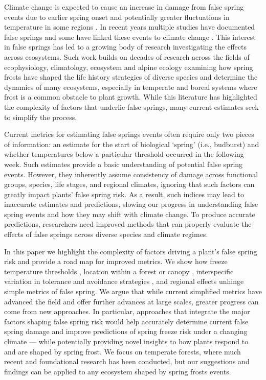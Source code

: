 \documentclass{article}\usepackage[]{graphicx}\usepackage[]{color}
\begin{document}
Climate change is expected to cause an increase in damage from false spring events due to earlier spring onset and potentially greater fluctuations in temperature in some regions \citep{Inouye2008, Martin2010}. In recent years multiple studies have documented false springs \citep{Augspurger2009, Augspurger2013, Gu2008, Menzel2015} and some have linked these events to climate change \citep{Allstadt2015, Ault2013,  Muffler2016, Vitra2017, Xin2016}. This interest in false springs has led to a growing body of research investigating the effects across ecosystems. Such work builds on decades of research across the fields of ecophysiology, climatology, ecosystem and alpine ecology examining how spring frosts have shaped the life history strategies of diverse species and determine the dynamics of many ecosystems, especially in temperate and boreal systems where frost is a common obstacle to plant growth. While this literature has highlighted the complexity of factors that underlie false springs, many current estimates seek to simplify the process. 

Current metrics for estimating false springs events often require only two pieces of information: an estimate for the start of biological `spring' (i.e., budburst) and whether temperatures below a particular threshold occurred in the following week. Such estimates provide a basic understanding of potential false spring events. However, they inherently assume consistency of damage across functional groups, species, life stages, and regional climates, ignoring that such factors can greatly impact plants' false spring risk. As a result, such indices may lead to inaccurate estimates and predictions, slowing our progress in understanding false spring events and how they may shift with climate change. To produce accurate predictions, researchers need improved methods that can properly evaluate the effects of false springs across diverse species and climate regimes.

In this paper we highlight the complexity of factors driving a plant's false spring risk and provide a road map for improved metrics. We show how freeze temperature thresholds \citep{Lenz2013}, location within a forest or canopy \citep{Augspurger2013}, interspecific variation in tolerance and avoidance strategies \citep{Martin2010, Muffler2016}, and regional effects \citep{Muffler2016} unhinge simple metrics of false spring. We argue that while current simplified metrics have advanced the field and offer further advances at large scales, greater progress can come from new approaches. In particular, approaches that integrate the major factors shaping false spring risk would help accurately determine current false spring damage and improve predictions of spring freeze risk under a changing climate --- while potentially providing novel insights to how plants respond to and are shaped by spring frost. We focus on temperate forests, where much recent and foundational research has been conducted, but our suggestions and findings can be applied to any ecosystem shaped by spring frosts events.   
\end{document}
